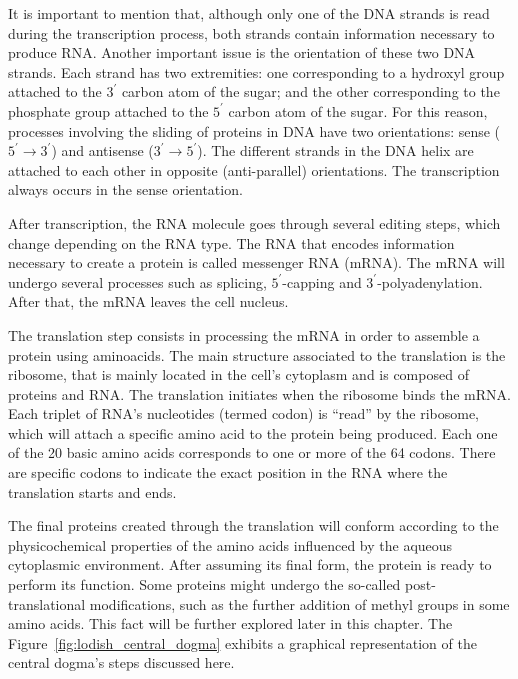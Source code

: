 It is important to mention that, although only one of the DNA strands is read during the transcription process, both strands contain information necessary to produce RNA. Another important issue is the orientation of these two DNA strands. Each strand has two extremities: one corresponding to a hydroxyl group attached to the $3^\prime$ carbon atom of the sugar; and the other corresponding to the phosphate group attached to the $5^\prime$ carbon atom of the sugar. For this reason, processes involving the sliding of proteins in DNA have two orientations: sense ($5^\prime \rightarrow 3^\prime$) and antisense ($3^\prime \rightarrow 5^\prime$). The different strands in the DNA helix are attached to each other in opposite (anti-parallel) orientations. The transcription always occurs in the sense orientation.

After transcription, the RNA molecule goes through several editing steps, which change depending on the RNA type. The RNA that encodes information necessary to create a protein is called messenger RNA (mRNA). The mRNA will undergo several processes such as splicing, $5^\prime$-capping and $3^\prime$-polyadenylation. After that, the mRNA leaves the cell nucleus.

The translation step consists in processing the mRNA in order to assemble a protein using aminoacids. The main structure associated to the translation is the ribosome, that is mainly located in the cell's cytoplasm and is composed of proteins and RNA. The translation initiates when the ribosome binds the mRNA. Each triplet of RNA's nucleotides (termed codon) is ``read'' by the ribosome, which will attach a specific amino acid to the protein being produced. Each one of the 20 basic amino acids corresponds to one or more of the 64 codons. There are specific codons to indicate the exact position in the RNA where the translation starts and ends.

The final proteins created through the translation will conform according to the physicochemical properties of the amino acids influenced by the aqueous cytoplasmic environment. After assuming its final form, the protein is ready to perform its function. Some proteins might undergo the so-called post-translational modifications, such as the further addition of methyl groups in some amino acids. This fact will be further explored later in this chapter. The Figure~\ref{fig:lodish_central_dogma} exhibits a graphical representation of the central dogma's steps discussed here.

